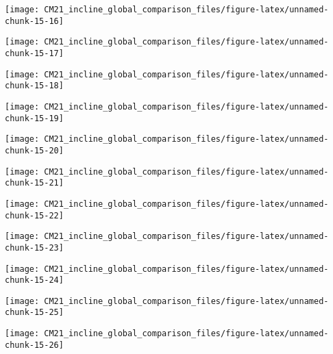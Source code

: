 \documentclass[
  10pt,
  a4paper,oneside]{article}
\begin{document}
\begin{center}\texttt{[image: CM21\_incline\_global\_comparison\_files/figure-latex/unnamed-chunk-15-16]} \end{center}

\begin{center}\texttt{[image: CM21\_incline\_global\_comparison\_files/figure-latex/unnamed-chunk-15-17]} \end{center}

\begin{center}\texttt{[image: CM21\_incline\_global\_comparison\_files/figure-latex/unnamed-chunk-15-18]} \end{center}

\begin{center}\texttt{[image: CM21\_incline\_global\_comparison\_files/figure-latex/unnamed-chunk-15-19]} \end{center}

\begin{center}\texttt{[image: CM21\_incline\_global\_comparison\_files/figure-latex/unnamed-chunk-15-20]} \end{center}

\begin{center}\texttt{[image: CM21\_incline\_global\_comparison\_files/figure-latex/unnamed-chunk-15-21]} \end{center}

\begin{center}\texttt{[image: CM21\_incline\_global\_comparison\_files/figure-latex/unnamed-chunk-15-22]} \end{center}

\begin{center}\texttt{[image: CM21\_incline\_global\_comparison\_files/figure-latex/unnamed-chunk-15-23]} \end{center}

\begin{center}\texttt{[image: CM21\_incline\_global\_comparison\_files/figure-latex/unnamed-chunk-15-24]} \end{center}

\begin{center}\texttt{[image: CM21\_incline\_global\_comparison\_files/figure-latex/unnamed-chunk-15-25]} \end{center}

\begin{center}\texttt{[image: CM21\_incline\_global\_comparison\_files/figure-latex/unnamed-chunk-15-26]} \end{center}
\end{document}
